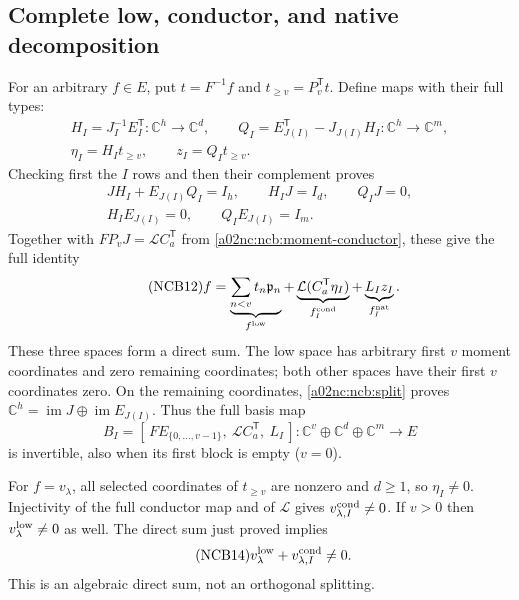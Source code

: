 \subsection{Complete low, conductor, and native decomposition}
For an arbitrary $f\in E$, put $t=F^{-1}f$ and
$t_{\geq v}=P_v^{\mathsf T}t$. Define maps with their full types:
\begin{equation}\tag{NCB10}\label{a02nc:ncb:HQ}
\begin{gathered}
H_I=J_I^{-1}E_I^{\mathsf T}:\mathbb C^h\to\mathbb C^d,\qquad
Q_I=E_{J(I)}^{\mathsf T}-J_{J(I)}H_I:
       \mathbb C^h\to\mathbb C^m,\\
\eta_I=H_It_{\geq v},\qquad z_I=Q_It_{\geq v}.
\end{gathered}
\end{equation}
Checking first the $I$ rows and then their complement proves
\begin{equation}\tag{NCB11}\label{a02nc:ncb:split}
\begin{gathered}
JH_I+E_{J(I)}Q_I=I_h,\qquad H_IJ=I_d,\qquad Q_IJ=0,\\
H_IE_{J(I)}=0,\qquad Q_IE_{J(I)}=I_m.
\end{gathered}
\end{equation}
Together with $FP_vJ=\mathcal LC_a^{\mathsf T}$ from
\eqref{a02nc:ncb:moment-conductor}, these give the full identity
\begin{equation}\tag{NCB12}\label{a02nc:ncb:decomposition}
f=\underbrace{\sum_{n<v}t_n\mathfrak p_n}_{f^{\rm low}}
 +\underbrace{\mathcal L(C_a^{\mathsf T}\eta_I)}_{f_I^{\rm cond}}
 +\underbrace{L_Iz_I}_{f_I^{\rm nat}} .
\end{equation}
These three spaces form a direct sum. The low space has arbitrary
first $v$ moment coordinates and zero remaining coordinates; both
other spaces have their first $v$ coordinates zero. On the remaining
coordinates, \eqref{a02nc:ncb:split} proves
$\mathbb C^h=\operatorname{im}J\oplus\operatorname{im}E_{J(I)}$.
Thus the full basis map
\begin{equation}\tag{NCB13}\label{a02nc:ncb:full-chart}
B_I=[\,FE_{\{0,\ldots,v-1\}},\ \mathcal LC_a^{\mathsf T},\ L_I\,]:
\mathbb C^v\oplus\mathbb C^d\oplus\mathbb C^m\longrightarrow E
\end{equation}
is invertible, also when its first block is empty ($v=0$).

For $f=v_\lambda$, all selected coordinates of $t_{\geq v}$ are
nonzero and $d\geq1$, so $\eta_I\ne0$. Injectivity of the full
conductor map and of $\mathcal L$ gives
$v_{\lambda,I}^{\rm cond}\ne0$. If $v>0$ then
$v_\lambda^{\rm low}\ne0$ as well. The direct sum just proved implies
\begin{equation}\tag{NCB14}\label{a02nc:ncb:nonzero}
v_\lambda^{\rm low}+v_{\lambda,I}^{\rm cond}\ne0 .
\end{equation}
This is an algebraic direct sum, not an orthogonal splitting.

